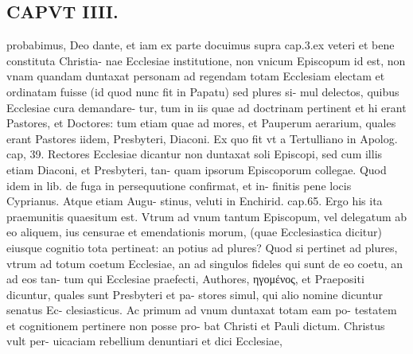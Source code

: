 \documentclass{article}
\begin{document}
\begin{pages}
\section*{CAPVT  IIII. }
\marginpar{[ p.241 ]}\pstart probabimus, Deo dante, et iam ex parte docuimus supra cap.3.ex veteri et bene constituta Christia- nae Ecclesiae institutione, non vnicum Episcopum id est, non vnam quandam duntaxat personam ad regendam totam Ecclesiam electam et ordinatam fuisse (id quod nunc fit in Papatu) sed plures si- mul delectos, quibus Ecclesiae cura demandare- tur, tum in iis quae ad doctrinam pertinent et hi erant Pastores, et Doctores: tum etiam quae ad mores, et Pauperum aerarium, quales erant Pastores iidem, Presbyteri, Diaconi. Ex quo fit vt a Tertulliano in Apolog. cap, 39. Rectores Ecclesiae dicantur non duntaxat soli Episcopi, sed cum illis etiam Diaconi, et Presbyteri, tan- quam ipsorum Episcoporum collegae. Quod idem in lib.  de fuga in persequutione confirmat, et in- finitis pene locis Cyprianus. Atque etiam Augu- stinus, veluti in Enchirid. cap.65. Ergo his ita praemunitis quaesitum est. Vtrum ad vnum tantum Episcopum, vel delegatum ab eo aliquem, ius censurae et emendationis morum, (quae Ecclesiastica dicitur) eiusque cognitio tota pertineat: an potius ad plures? Quod si pertinet ad plures, vtrum ad totum coetum Ecclesiae, an ad singulos fideles qui sunt de eo coetu, an ad eos tan- tum qui Ecclesiae praefecti, Authores, ηγομένος, et Praepositi dicuntur, quales sunt Presbyteri et pa- stores simul, qui alio nomine dicuntur senatus Ec- clesiasticus. Ac primum ad vnum duntaxat totam eam po- testatem et cognitionem pertinere non posse pro- bat Christi et Pauli dictum. Christus vult per- uicaciam rebellium denuntiari et dici Ecclesiae,  \pend

\end{pages}
\end{document}

